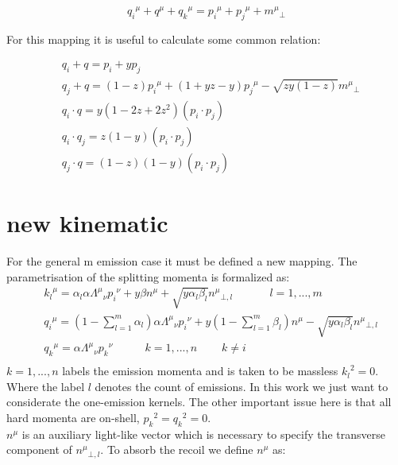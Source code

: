 \begin{equation}
{q_i}^{\mu}+q^{\mu}+ {q_k}^{\mu}={p_i}^{\mu}+{p_j}^{\mu}+{m^{\mu}}_{\bot}
\end{equation}

For this mapping it is useful to calculate some common relation:

\begin{equation}
\begin{split}
&q_i +q      = p_i + yp_j \\
&q_j +q      = (1-z){p_i}^{\mu} + (1+yz-y) {p_j}^{\mu} - \sqrt{zy(1-z)}{m^{\mu}}_{\bot}\\
&q_i \cdot q = y(1-2z+2z^2)(p_i \cdot p_j)\\
&q_i \cdot q_j = z(1-y) (p_i \cdot p_j)\\
&q_j \cdot q = (1-z)(1-y) (p_i \cdot p_j)
\end{split}
\end{equation}

\section{new kinematic}
For the general m emission case it must be defined a new mapping. The parametrisation of the splitting momenta is formalized as:
\begin{equation}
	\begin{split}
	&{k_l}^{\mu} = \alpha_l \alpha {\Lambda^{\mu}}_{\nu}{p_i}^{\nu} + y\beta{n}^{\mu} + \sqrt{y\alpha_l\beta_l}{n^{\mu}}_{\bot,l} \:\:\:\:\:\:\:\:\:\:\:\:\:\:\:{l=1,...,m} \\
	&{q_i}^{\mu}   = (1-\displaystyle\sum\limits_{l=1}^m \alpha_l) \alpha {\Lambda^{\mu}}_{\nu}{p_i}^{\nu} + y(1-\displaystyle\sum\limits_{l=1}^m \beta_l){n}^{\mu} - \sqrt{y\alpha_l\beta_l}{n^{\mu}}_{\bot,l} \\
	&{q_k}^{\mu} = \alpha {\Lambda^{\mu}}_{\nu}{p_k}^{\nu} \:\:\:\:\:\:\:\:\:\:\:\:\: {k=1,...,n}\:\:\:\:\:\:\:\:\:\:k\neq i\\
    \end{split}
\end{equation}
$ k = 1,...,n $ labels the emission momenta and is taken to be massless $ {k_l}^2 = 0 $. Where the label $ l $ denotes the count of emissions. In this work we just want to considerate the one-emission kernels. The other important issue here is that all hard momenta are on-shell, $ {p_k}^2={q_k}^2=0 $.\\
$ n^{\mu} $ is an auxiliary light-like vector which is necessary to specify the transverse component of $ {n^{\mu}}_{\bot,l} $.
To absorb the recoil we define $ n^{\mu} $ as:


